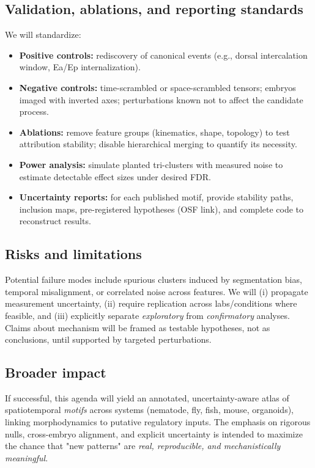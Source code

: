 \documentclass[unnumsec,webpdf,modern,large,namedate]{oup-authoring-template}%
\theoremstyle{thmstyleone}\newtheorem{theorem}{Theorem}
\theoremstyle{thmstyletwo}\newtheorem{example}{Example}
\theoremstyle{thmstylethree}\newtheorem{definition}{Definition}
\begin{document}
\subsection{Validation, ablations, and reporting standards}
We will standardize:
\begin{itemize}
  \item \textbf{Positive controls:} rediscovery of canonical events (e.g., dorsal
  intercalation window, Ea/Ep internalization).
  \item \textbf{Negative controls:} time-scrambled or space-scrambled tensors; embryos
  imaged with inverted axes; perturbations known not to affect the candidate process.
  \item \textbf{Ablations:} remove feature groups (kinematics, shape, topology) to
  test attribution stability; disable hierarchical merging to quantify its necessity.
  \item \textbf{Power analysis:} simulate planted tri-clusters with measured noise to
  estimate detectable effect sizes under desired FDR.
  \item \textbf{Uncertainty reports:} for each published motif, provide stability paths,
  inclusion maps, pre-registered hypotheses (OSF link), and complete code to reconstruct results.
\end{itemize}

\subsection{Risks and limitations}
Potential failure modes include spurious clusters induced by segmentation bias, temporal
misalignment, or correlated noise across features.  We will (i) propagate measurement
uncertainty, (ii) require replication across labs/conditions where feasible, and
(iii) explicitly separate \emph{exploratory} from \emph{confirmatory} analyses.  Claims
about mechanism will be framed as testable hypotheses, not as conclusions, until
supported by targeted perturbations.

\subsection{Broader impact}
If successful, this agenda will yield an annotated, uncertainty-aware atlas of
spatiotemporal \emph{motifs} across systems (nematode, fly, fish, mouse, organoids),
linking morphodynamics to putative regulatory inputs.  The emphasis on rigorous nulls,
cross-embryo alignment, and explicit uncertainty is intended to maximize the chance that
"new patterns" are \emph{real, reproducible, and mechanistically meaningful}.
\end{document}
